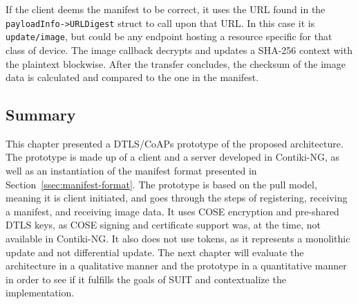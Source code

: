 \documentclass[0-thesis.tex]{subfiles}
\begin{document}
If the client deems the manifest to be correct, it uses the URL found in the
\texttt{payloadInfo->URLDigest} struct to call upon that URL. In this case it is
\texttt{update/image}, but could be any endpoint hosting a resource specific for that
class of device. The image callback decrypts and updates a SHA-256 context with the
plaintext blockwise. After the transfer concludes, the checksum of the image data is
calculated and compared to the one in the manifest.


\subsection{Summary}
\label{ssec:implementation-summary}
This chapter presented a DTLS/CoAPs prototype of the proposed architecture. The prototype
is made up of a client and a server developed in Contiki-NG, as well as an instantiation
of the manifest format presented in Section~\ref{ssec:manifest-format}. The prototype is
based on the pull model, meaning it is client initiated, and goes through the steps of
registering, receiving a manifest, and receiving image data. It uses COSE encryption and
pre-shared DTLS keys, as COSE signing and certificate support was, at the time, not
available in Contiki-NG. It also does not use tokens, as it represents a monolithic update
and not differential update. The next chapter will evaluate the architecture in a
qualitative manner and the prototype in a quantitative manner in order to see if it
fulfills the goals of SUIT and contextualize the implementation.
\end{document}

